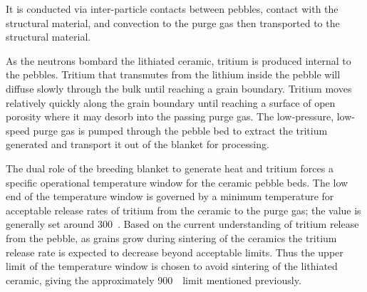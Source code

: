  It is conducted via inter-particle contacts between pebbles, contact with the structural material, and convection to the purge gas then transported to the structural material. 

As the neutrons bombard the lithiated ceramic, tritium is produced internal to the pebbles. Tritium that transmutes from the lithium inside the pebble will diffuse slowly through the bulk until reaching a grain boundary. Tritium moves relatively quickly along the grain boundary until reaching a surface of open porosity where it may desorb into the passing purge gas.\cite{Federici1990} The low-pressure, low-speed purge gas is pumped through the pebble bed to extract the tritium generated and transport it out of the blanket for processing. 

The dual role of the breeding blanket to generate heat and tritium forces a specific operational temperature window for the ceramic pebble beds. The low end of the temperature window is governed by a minimum temperature for acceptable release rates of tritium from the ceramic to the purge gas; the value is generally set around 300~\celsius. Based on the current understanding of tritium release from the pebble, as grains grow during sintering of the ceramics the tritium release rate is expected to decrease beyond acceptable limits. Thus the upper limit of the temperature window is chosen to avoid sintering of the lithiated ceramic, giving the approximately 900~\celsius~limit mentioned previously. 

